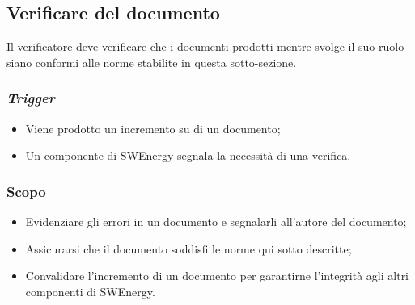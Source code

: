 \subsection{Verificare del documento}
\label{verifica-documento}

Il verificatore deve verificare che i documenti prodotti mentre svolge il suo
ruolo siano conformi alle norme stabilite in questa sotto-sezione.

\subsubsection{\textit{Trigger}}
\begin{itemize}
	\item Viene prodotto un incremento su di un documento;

	\item Un componente di SWEnergy segnala la necessità di una verifica.
\end{itemize}

\subsubsection{Scopo}
\begin{itemize}
	\item Evidenziare gli errori in un documento e segnalarli all'autore del
	      documento;

	\item Assicurarsi che il documento soddisfi le norme qui sotto descritte;

	\item Convalidare l'incremento di un documento per garantirne l'integrità
	      agli altri componenti di SWEnergy.
\end{itemize}


